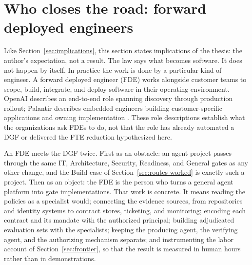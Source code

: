 \section{Who closes the road: forward deployed engineers}
\label{sec:fde}

Like Section~\ref{sec:implications}, this section states implications of the thesis: the author's
expectation, not a result. The law says what becomes software. It does not happen by itself. In practice the work is done by a
particular kind of engineer. A forward deployed engineer (FDE) works alongside customer teams to
scope, build, integrate, and deploy software in their operating environment. OpenAI describes an
end-to-end role spanning discovery through production rollout; Palantir describes embedded engineers
building customer-specific applications and owning implementation \citep{openaifde2026,palantirfde2026}.
These role descriptions establish what the organizations ask FDEs to do, not that the role has already
automated a DGF or delivered the FTE reduction hypothesized here.

An FDE meets the DGF twice. First as an obstacle: an agent project passes through the same IT,
Architecture, Security, Readiness, and General gates as any other change, and the Build case of
Section~\ref{sec:routes-worked} is exactly such a project. Then as an object: the FDE is the person
who turns a general agent platform into gate implementations. That work is concrete. It means reading
the policies as a specialist would; connecting the evidence sources, from repositories and identity
systems to contract stores, ticketing, and monitoring; encoding each contract and its mandate with the
authorized principal; building adjudicated evaluation sets with the specialists; keeping the producing
agent, the verifying agent, and the authorizing mechanism separate; and instrumenting the labor
account of Section~\ref{sec:frontier}, so that the result is measured in human hours rather than in
demonstrations.

